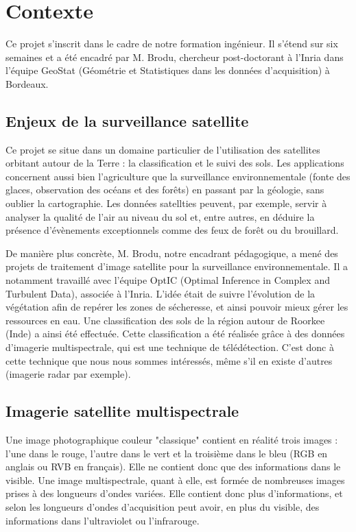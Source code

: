 
\section{Contexte}

Ce projet s'inscrit dans le cadre de notre formation ingénieur. Il s'étend sur six semaines et a été encadré par M. Brodu, chercheur post-doctorant à l'Inria dans l'équipe GeoStat (Géométrie et Statistiques dans les données d'acquisition) à Bordeaux. 

\subsection{Enjeux de la surveillance satellite}

Ce projet se situe dans un domaine particulier de l'utilisation des satellites orbitant autour de la Terre : la classification et le suivi des sols. 
Les applications concernent aussi bien l'agriculture que la surveillance environnementale (fonte des glaces, observation des océans et des forêts) en passant par la géologie, sans oublier la cartographie.
Les données satellties peuvent, par exemple, servir à analyser la qualité de l'air au niveau du sol et, entre autres, en déduire la présence d'évènements exceptionnels comme des feux de forêt ou du brouillard\cite{airSurv}. 

De manière plus concrète, M. Brodu, notre encadrant pédagogique, a mené des projets de traitement d'image satellite pour la surveillance environnementale. Il a notamment travaillé avec l'équipe OptIC (Optimal Inference in Complex and Turbulent Data), associée à l'Inria. L'idée était de suivre l'évolution de la végétation afin de repérer les zones de sécheresse, et ainsi pouvoir mieux gérer les ressources en eau. Une classification des sols de la région autour de Roorkee (Inde) a ainsi été effectuée. 
Cette classification a été réalisée grâce à des données d'imagerie multispectrale, qui est une technique de télédétection. C'est donc à cette technique que nous nous sommes intéressés, même s'il en existe d'autres (imagerie radar par exemple). 

\subsection{Imagerie satellite multispectrale}

Une image photographique couleur "classique" contient en réalité trois images : l'une dans le rouge, l'autre dans le vert et la troisième dans le bleu (RGB en anglais ou RVB en français). Elle ne contient donc que des informations dans le visible. 
Une image multispectrale, quant à elle, est formée de nombreuses images prises à des longueurs d'ondes variées. Elle contient donc plus d'informations, et selon les longueurs d'ondes d'acquisition peut avoir, en plus du visible, des informations dans l'ultraviolet ou l'infrarouge.

